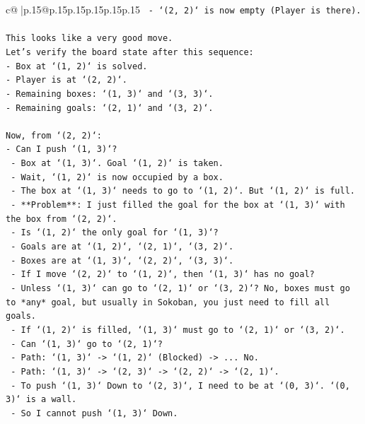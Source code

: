 \documentclass{article}
\begin{document}
{\begin{supertabular}{c@{$\;$}|p{.15\linewidth}@{}p{.15\linewidth}p{.15\linewidth}p{.15\linewidth}p{.15\linewidth}p{.15\linewidth}}
{{{\texttt{     {-} `(2, 2)` is now empty (Player is there).} \\
\\ 
\texttt{This looks like a very good move.} \\
\texttt{Let's verify the board state after this sequence:} \\
\texttt{{-} Box at `(1, 2)` is solved.} \\
\texttt{{-} Player is at `(2, 2)`.} \\
\texttt{{-} Remaining boxes: `(1, 3)` and `(3, 3)`.} \\
\texttt{{-} Remaining goals: `(2, 1)` and `(3, 2)`.} \\
\\ 
\texttt{Now, from `(2, 2)`:} \\
\texttt{{-} Can I push `(1, 3)`?} \\
\texttt{  {-} Box at `(1, 3)`. Goal `(1, 2)` is taken.} \\
\texttt{  {-} Wait, `(1, 2)` is now occupied by a box.} \\
\texttt{  {-} The box at `(1, 3)` needs to go to `(1, 2)`. But `(1, 2)` is full.} \\
\texttt{  {-} **Problem**: I just filled the goal for the box at `(1, 3)` with the box from `(2, 2)`.} \\
\texttt{  {-} Is `(1, 2)` the only goal for `(1, 3)`?} \\
\texttt{  {-} Goals are at `(1, 2)`, `(2, 1)`, `(3, 2)`.} \\
\texttt{  {-} Boxes are at `(1, 3)`, `(2, 2)`, `(3, 3)`.} \\
\texttt{  {-} If I move `(2, 2)` to `(1, 2)`, then `(1, 3)` has no goal?} \\
\texttt{  {-} Unless `(1, 3)` can go to `(2, 1)` or `(3, 2)`? No, boxes must go to *any* goal, but usually in Sokoban, you just need to fill all goals.} \\
\texttt{  {-} If `(1, 2)` is filled, `(1, 3)` must go to `(2, 1)` or `(3, 2)`.} \\
\texttt{  {-} Can `(1, 3)` go to `(2, 1)`?} \\
\texttt{    {-} Path: `(1, 3)` {-}> `(1, 2)` (Blocked) {-}> ... No.} \\
\texttt{    {-} Path: `(1, 3)` {-}> `(2, 3)` {-}> `(2, 2)` {-}> `(2, 1)`.} \\
\texttt{    {-} To push `(1, 3)` Down to `(2, 3)`, I need to be at `(0, 3)`. `(0, 3)` is a wall.} \\
\texttt{    {-} So I cannot push `(1, 3)` Down.} \\
}}}
\end{supertabular}}
\end{document}
